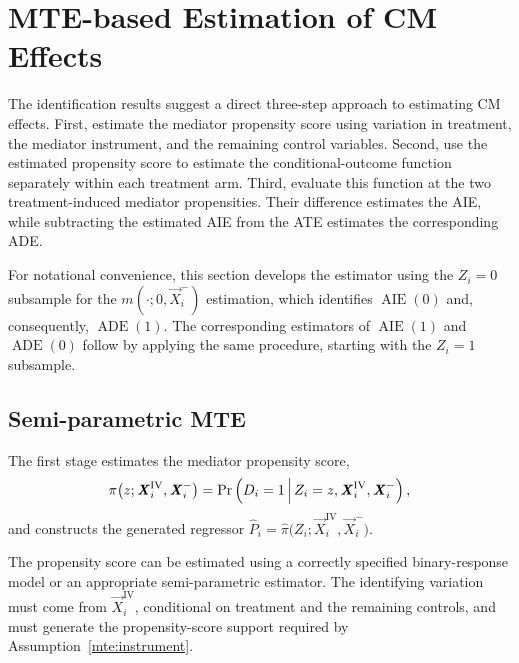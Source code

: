 \section{MTE-based Estimation of CM Effects}
\label{sec:controlfun}

The identification results suggest a direct three-step approach to estimating CM effects.
First, estimate the mediator propensity score using variation in treatment, the mediator instrument, and the remaining control variables.
Second, use the estimated propensity score to estimate the conditional-outcome function separately within each treatment arm.
Third, evaluate this function at the two treatment-induced mediator propensities.
Their difference estimates the AIE, while subtracting the estimated AIE from the ATE estimates the corresponding ADE.

For notational convenience, this section develops the estimator using the $Z_i=0$ subsample for the $m(\cdot;0,\vec X_i^-)$ estimation, which identifies $\operatorname{AIE}(0)$ and, consequently, $\operatorname{ADE}(1)$.
The corresponding estimators of $\operatorname{AIE}(1)$ and $\operatorname{ADE}(0)$ follow by applying the same procedure, starting with the $Z_i=1$ subsample.

\subsection{Semi-parametric MTE}
\label{sec:semiparametric-mte}

The first stage estimates the mediator propensity score,
\[
    \pi
    \big(
        z;
        \boldsymbol{\mathit{X}}_i^{\mathrm{IV}},
        \boldsymbol{\mathit{X}}_i^-
    \big)
    =
    \Pr\left( 
        D_i=1
     \, \middle\vert \, 
        Z_i=z,
        \boldsymbol{\mathit{X}}_i^{\mathrm{IV}},
        \boldsymbol{\mathit{X}}_i^-
     \right),
\]
and constructs the generated regressor
\( \widehat P_i
    =
    \widehat\pi
    \big(
        Z_i;
        \vec X_i^{\mathrm{IV}},
        \vec X_i^-
    \big) \).

The propensity score can be estimated using a correctly specified binary-response model or an appropriate semi-parametric estimator.
The identifying variation must come from $\vec X_i^{\mathrm{IV}}$, conditional on treatment and the remaining controls, and must generate the propensity-score support required by Assumption~\ref{mte:instrument}.

